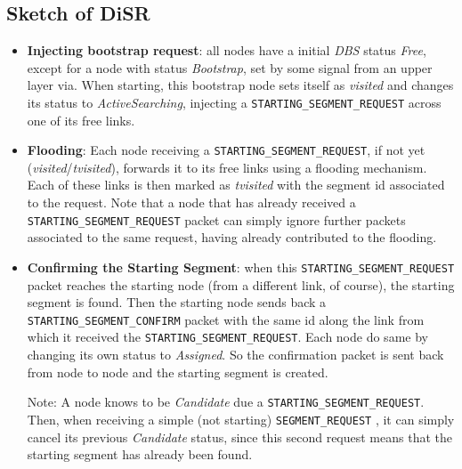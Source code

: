 \subsection{Sketch of DiSR}

\begin{itemize}

\item{\textbf{Injecting bootstrap request}}: all nodes have a initial
\emph{DBS} status \emph{Free}, except for a
 node with status \emph{Bootstrap}, set by some signal from an
upper layer via. When starting, this bootstrap node sets itself as \emph{visited} and
changes its status to \emph{ActiveSearching}, injecting a
\texttt{STARTING\_SEGMENT\_REQUEST} across one of its free links. 

\item{\textbf{Flooding}}: Each node receiving a \texttt{STARTING\_SEGMENT\_REQUEST},
if not yet (\emph{visited}/\emph{tvisited}),  forwards it to its free links using a flooding mechanism.
Each of these links is then marked as \emph{tvisited} with the segment id
associated to the request. Note that a node that has already received a
\texttt{STARTING\_SEGMENT\_REQUEST} packet can simply ignore further packets
associated to the same request, having already contributed to the
flooding. 

\item{\textbf{Confirming the Starting Segment}}: when this \texttt{STARTING\_SEGMENT\_REQUEST} packet reaches
the starting node (from a different link, of course), the starting
segment is found. Then the starting node sends back a \texttt{STARTING\_SEGMENT\_CONFIRM}
packet with the same id along the link from which it received the
\texttt{STARTING\_SEGMENT\_REQUEST}. Each node do same by changing its own status
to \emph{Assigned}. So the confirmation packet is sent back from
node to node and the starting segment is created. 

Note: A node knows to be \emph{Candidate} due a
\texttt{STARTING\_SEGMENT\_REQUEST}.  Then, when receiving a simple
(not starting) \texttt{SEGMENT\_REQUEST} , it can simply cancel its
previous \emph{Candidate} status, since this second
request means that the starting segment has already been found. 



\end{itemize}
